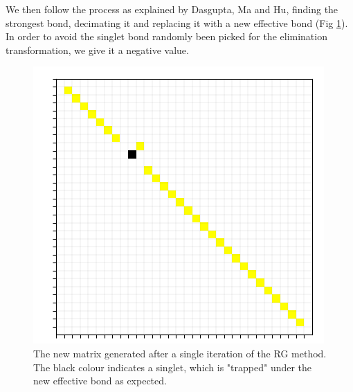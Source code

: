 \documentclass[../numerical,,../../main.tex]{subfiles}
\begin{document}
We then follow the process as explained by Dasgupta, Ma and Hu\cite{dasgupta-hu, ma}, finding the strongest bond, decimating it and replacing it with a new effective bond (Fig \ref{fig:rgone}). In order to avoid the singlet bond randomly been picked for the elimination transformation, we give it a negative value.
\begin{figure}[h!]
    \centering
    \includegraphics[scale=0.3]{Chapter5/Figures/RG/midrg1.png}
    \caption{The new matrix generated after a single iteration of the RG method. The black colour indicates a singlet, which is "trapped" under the new effective bond as expected.}
    \label{fig:rgone}
\end{figure}
\end{document}
